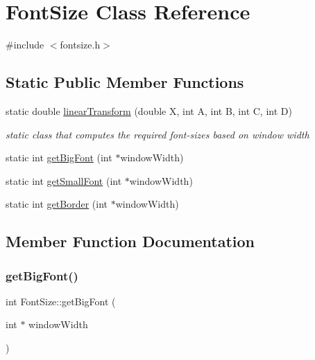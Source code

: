 \hypertarget{class_font_size}{}\section{Font\+Size Class Reference}
\label{class_font_size}


{\ttfamily \#include $<$fontsize.\+h$>$}

\subsection*{Static Public Member Functions}
\begin{DoxyCompactItemize}
\item 
static double \mbox{\hyperlink{class_font_size_ada2f9f5c9056fcdc738df0187895d1f2}{linear\+Transform}} (double X, int A, int B, int C, int D)
\begin{DoxyCompactList}\small\item\em static class that computes the required font-\/sizes based on window width \end{DoxyCompactList}\item 
static int \mbox{\hyperlink{class_font_size_a9d85262c3fa01a4500e25cf40cbd1c82}{get\+Big\+Font}} (int $\ast$window\+Width)
\item 
static int \mbox{\hyperlink{class_font_size_ac20daf65517d4a6f0892cb6c46b30739}{get\+Small\+Font}} (int $\ast$window\+Width)
\item 
static int \mbox{\hyperlink{class_font_size_a341e329a4ab9d0688d95b117398d324d}{get\+Border}} (int $\ast$window\+Width)
\end{DoxyCompactItemize}


\subsection{Member Function Documentation}
\mbox{\label{class_font_size_a9d85262c3fa01a4500e25cf40cbd1c82}} 
\subsubsection{\texorpdfstring{get\+Big\+Font()}{getBigFont()}}
{\footnotesize\ttfamily int Font\+Size\+::get\+Big\+Font (\begin{DoxyParamCaption}\item[{int $\ast$}]{window\+Width }\end{DoxyParamCaption})\hspace{0.3cm}{\ttfamily [static]}}

